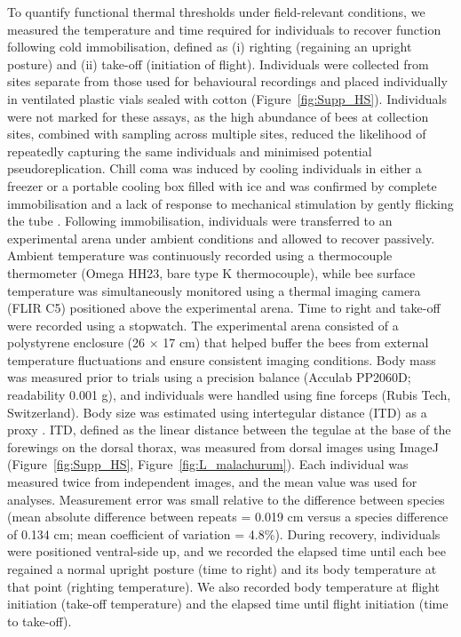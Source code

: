\documentclass[11pt,a4paper]{article}
\begin{document}
To quantify functional thermal thresholds under field-relevant conditions, we measured the temperature and time required for individuals to recover function following cold immobilisation, defined as (i) righting (regaining an upright posture) and (ii) take-off (initiation of flight). Individuals were collected from sites separate from those used for behavioural recordings and placed individually in ventilated plastic vials sealed with cotton (Figure~\ref{fig:Supp_HS}). Individuals were not marked for these assays, as the high abundance of bees at collection sites, combined with sampling across multiple sites, reduced the likelihood of repeatedly capturing the same individuals and minimised potential pseudoreplication. Chill coma was induced by cooling individuals in either a freezer or a portable cooling box filled with ice and was confirmed by complete immobilisation and a lack of response to mechanical stimulation by gently flicking the tube \citep{Oyen2021, David1998, Anderson2005}. Following immobilisation, individuals were transferred to an experimental arena under ambient conditions and allowed to recover passively. Ambient temperature was continuously recorded using a thermocouple thermometer (Omega HH23, bare type K thermocouple), while bee surface temperature was simultaneously monitored using a thermal imaging camera (FLIR C5) positioned above the experimental arena. Time to right and take-off were recorded using a stopwatch. The experimental arena consisted of a polystyrene enclosure (26 × 17 cm) that helped buffer the bees from external temperature fluctuations and ensure consistent imaging conditions. Body mass was measured prior to trials using a precision balance (Acculab PP2060D; readability 0.001 g), and individuals were handled using fine forceps (Rubis Tech, Switzerland). Body size was estimated using intertegular distance (ITD) as a proxy \citep{Cane1987}. ITD, defined as the linear distance between the tegulae at the base of the forewings on the dorsal thorax, was measured from dorsal images using ImageJ \citep{Schneider2012} (Figure~\ref{fig:Supp_HS}, Figure~\ref{fig:L_malachurum}). Each individual was measured twice from independent images, and the mean value was used for analyses. Measurement error was small relative to the difference between species (mean absolute difference between repeats = 0.019 cm versus a species difference of 0.134 cm; mean coefficient of variation = 4.8\%). During recovery, individuals were positioned ventral-side up, and we recorded the elapsed time until each bee regained a normal upright posture (time to right) and its body temperature at that point (righting temperature). We also recorded body temperature at flight initiation (take-off temperature) and the elapsed time until flight initiation (time to take-off). 
\end{document}
